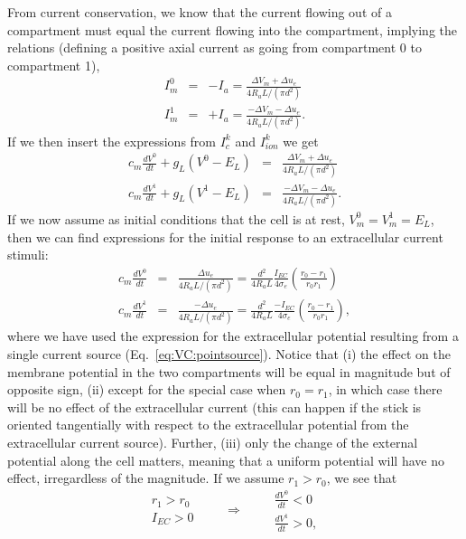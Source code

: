  
From current conservation, we know that the current flowing out of a compartment must equal the current flowing into the compartment, implying the relations (defining a positive axial current as going from compartment 0 to compartment 1),
\begin{eqnarray}
I_m^0 &=& - I_a = \frac{\Delta V_m + \Delta u_e}{4 R_a L / (\pi d^2)} \\
I_m^1 &=& + I_a =  \frac{-\Delta V_m - \Delta u_e}{4 R_a L / (\pi d^2)}.
\end{eqnarray}
If we then insert the expressions from $I^k_c$ and $I^k_{ion}$ we get
\begin{eqnarray}
c_m\frac{dV^0}{dt} + g_L (V^0 - E_L) &=& \frac{\Delta V_m + \Delta u_e}{4 R_a L / (\pi d^2)} \\
c_m\frac{dV^1}{dt} + g_L (V^1 - E_L) &=& \frac{-\Delta V_m - \Delta u_e}{4 R_a L / (\pi d^2)}.
\label{Stim:eq:two-comp-stim}
\end{eqnarray}
If we now assume as initial conditions that the cell is at rest, $V_m^0 = V_m^1 = E_L$, then we can find expressions for the initial response to an extracellular current stimuli:
\begin{eqnarray}
\label{Stim:eq:initial_response}
c_m\frac{dV^0}{dt} &=& \frac{\Delta u_e}{4 R_a L / (\pi d^2)} =  \frac{d^2}{4 R_a L} \frac{I_{EC}}{4\sigma_e} \left(\frac{r_0 - r_1}{r_0 r_1} \right) \\
c_m\frac{dV^1}{dt} &=& \frac{- \Delta u_e}{4 R_a L / (\pi d^2)} =  \frac{d^2}{4 R_a L} \frac{-I_{EC}}{4 \sigma_e} \left(\frac{r_0 - r_1}{r_0 r_1} \right),
\end{eqnarray}
where we have used the expression for the extracellular potential resulting from a single current source (Eq.~\ref{eq:VC:pointsource}).
Notice that (i) the effect on the membrane potential in the two compartments will be equal in magnitude but of opposite sign, (ii) except for the special case when $r_0=r_1$, in which case there will be no effect of the extracellular current (this can happen if the stick is oriented tangentially with respect to the extracellular potential from the extracellular current source). Further, (iii) only the change of the external potential along the cell matters, meaning that a uniform potential will have no effect, irregardless of the magnitude. 
If we assume $r_1 > r_0$, we see that
\begin{equation}
 \begin{aligned}
        r_1>r_0\\
        I_{EC} > 0
       \end{aligned}
 \qquad \Rightarrow \qquad
 \begin{aligned}
        \frac{dV^0}{dt}<0\\
        \frac{dV^1}{dt}>0,
     \end{aligned}
\end{equation}
